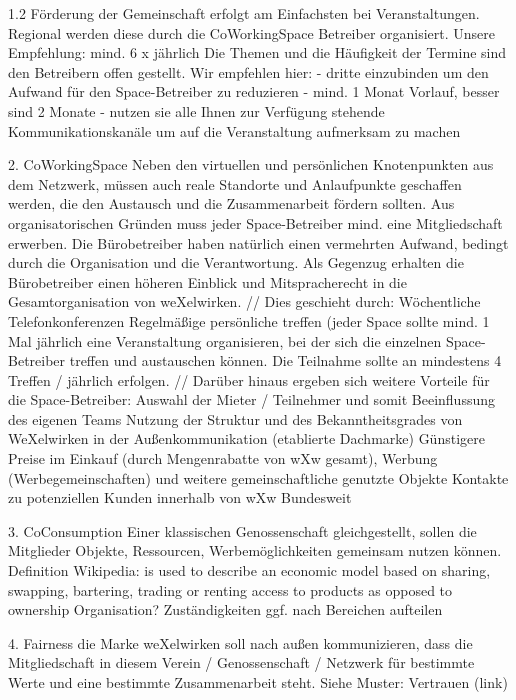1.2 Förderung der Gemeinschaft
erfolgt am Einfachsten bei Veranstaltungen. 
Regional werden diese durch die CoWorkingSpace Betreiber organisiert. Unsere Empfehlung: mind. 6 x jährlich 
Die Themen und die Häufigkeit der Termine sind den Betreibern offen gestellt. Wir empfehlen hier:
- dritte einzubinden um den Aufwand für den Space-Betreiber zu reduzieren
- mind. 1 Monat Vorlauf, besser sind 2 Monate
- nutzen sie alle Ihnen zur Verfügung stehende Kommunikationskanäle um auf die Veranstaltung aufmerksam zu machen


2. CoWorkingSpace
Neben den virtuellen und persönlichen Knotenpunkten aus dem Netzwerk, müssen auch reale Standorte und Anlaufpunkte geschaffen werden, die den Austausch und die Zusammenarbeit fördern sollten.
Aus organisatorischen Gründen muss jeder Space-Betreiber mind. eine Mitgliedschaft erwerben.
Die Bürobetreiber haben natürlich einen vermehrten Aufwand, bedingt durch die Organisation und die Verantwortung. Als Gegenzug erhalten die Bürobetreiber einen höheren Einblick und Mitspracherecht in die Gesamtorganisation von weXelwirken.
//
Dies geschieht durch:
Wöchentliche Telefonkonferenzen
Regelmäßige persönliche treffen (jeder Space sollte mind. 1 Mal jährlich eine Veranstaltung organisieren, bei der sich die einzelnen Space-Betreiber treffen und austauschen können. Die Teilnahme sollte an mindestens 4 Treffen / jährlich erfolgen.
//
Darüber hinaus ergeben sich weitere Vorteile für die Space-Betreiber: 
Auswahl der Mieter / Teilnehmer und somit Beeinflussung des eigenen Teams
Nutzung der Struktur und des Bekanntheitsgrades von WeXelwirken in der Außenkommunikation (etablierte Dachmarke)
Günstigere Preise im Einkauf (durch Mengenrabatte von wXw gesamt), Werbung (Werbegemeinschaften) und weitere gemeinschaftliche genutzte Objekte
Kontakte zu potenziellen Kunden innerhalb von wXw Bundesweit



3. CoConsumption
Einer klassischen Genossenschaft gleichgestellt, sollen die Mitglieder Objekte, Ressourcen, Werbemöglichkeiten gemeinsam nutzen können.
Definition Wikipedia:
is used to describe an economic model based on sharing, swapping, bartering, trading or renting access to products as opposed to ownership
Organisation?
Zuständigkeiten ggf. nach Bereichen aufteilen

4. Fairness
die Marke weXelwirken soll nach außen kommunizieren, dass die Mitgliedschaft in diesem Verein / Genossenschaft / Netzwerk für bestimmte Werte und eine bestimmte Zusammenarbeit steht. 
Siehe Muster: Vertrauen (link)

